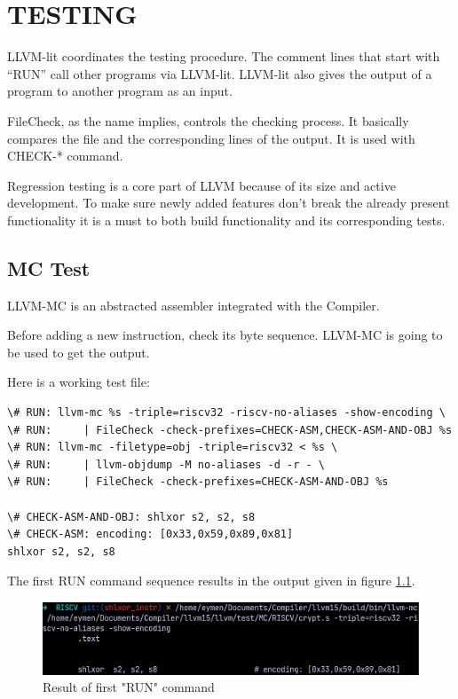 \clearpage
\chapter{TESTING}\label{Ch10}
LLVM-lit coordinates the testing procedure. The comment lines that start with “RUN” call other programs via LLVM-lit. LLVM-lit also gives the output of a program to another program as an input.

FileCheck, as the name implies, controls the checking process. It basically compares the file and the corresponding lines of the output. It is used with CHECK-* command.

Regression testing is a core part of LLVM because of its size and active development. To make sure newly added features don’t break the already present functionality it is a must to both build functionality and its corresponding tests.

\section{MC Test}
LLVM-MC is an abstracted assembler integrated with the Compiler. \cite{Lattner2010Apr}

Before adding a new instruction, check its byte sequence. LLVM-MC is going to be used to get the output. 

Here is a working test file:

\begin{lstlisting}
\# RUN: llvm-mc %s -triple=riscv32 -riscv-no-aliases -show-encoding \ 
\# RUN: 	| FileCheck -check-prefixes=CHECK-ASM,CHECK-ASM-AND-OBJ %s 
\# RUN: llvm-mc -filetype=obj -triple=riscv32 < %s \ 
\# RUN: 	| llvm-objdump -M no-aliases -d -r - \ 
\# RUN: 	| FileCheck -check-prefixes=CHECK-ASM-AND-OBJ %s 

\# CHECK-ASM-AND-OBJ: shlxor s2, s2, s8 
\# CHECK-ASM: encoding: [0x33,0x59,0x89,0x81] 
shlxor s2, s2, s8
\end{lstlisting}


The first RUN command sequence results in the output given in figure \ref{fig:result_of_first_run_command}.
\begin{figure}
    \centering
    \includegraphics{testing/result_of_first_run_command.png}
    \caption{Result of first "RUN" command}
    \label{fig:result_of_first_run_command}
\end{figure}

